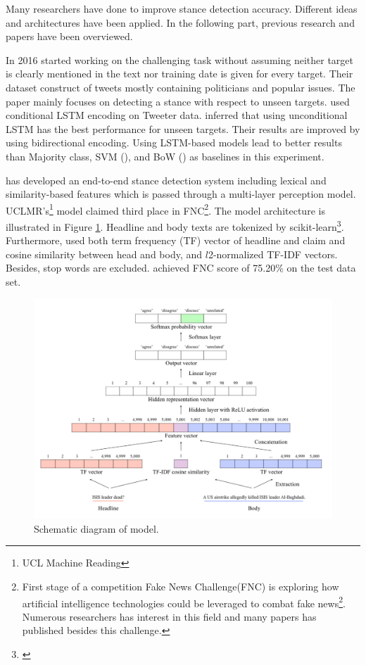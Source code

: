 Many researchers have done to improve stance detection accuracy. Different ideas and architectures have been applied. In the following part, previous research and papers have been overviewed.  

In 2016 \cite{Augenstein2016StanceDW} started working on the challenging task without assuming neither target is clearly mentioned in the text nor training date is given for every target. Their dataset construct of tweets mostly containing politicians and popular issues. The paper mainly focuses on detecting a stance with respect to unseen targets. \cite{Augenstein2016StanceDW} used conditional LSTM encoding on Tweeter data. \cite{Augenstein2016StanceDW} inferred that using unconditional LSTM has the best performance for unseen targets. Their results are improved by using bidirectional encoding. Using LSTM-based models lead to better results than Majority class, \ac{SVM} (\cite{svc}), and \ac{BoW} (\cite{bow}) as baselines in this experiment.

\cite{UCLMR} has developed an end-to-end stance detection system including lexical and similarity-based features which is passed through a multi-layer perception model. UCLMR's\footnote{UCL Machine Reading} model claimed third place in \ac{FNC}\footnote{First stage of a competition Fake News Challenge(\ac{FNC}) is exploring how artificial intelligence technologies could be leveraged to combat fake news\footnote{fakenewschallenge.org}. Numerous researchers has interest in this field and many papers has published besides this challenge.}. The model architecture is illustrated in Figure \ref{fig:UCLMR-system}. Headline and body texts are tokenized by scikit-learn\footnote{\cite{sikit-learn}}. Furthermore, \cite{UCLMR} used both term frequency (TF) vector of headline and claim and cosine similarity between head and body, and $l$2-normalized TF-IDF vectors. Besides, stop words are excluded. \cite{UCLMR} achieved \ac{FNC} score of 75.20\% on the test data set.
\begin{figure}
	\centering
	\includegraphics[scale=0.4]{statistics/stance/simple-baseline-FNC.png}
	\caption{Schematic diagram of \cite{UCLMR} model.}
	\label{fig:UCLMR-system}
\end{figure}


